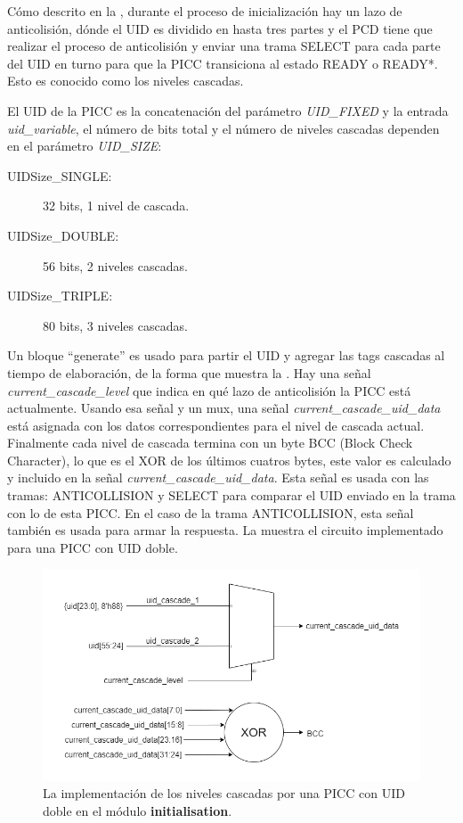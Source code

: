 \documentclass[a4paper, twoside, 11pt]{report}
\begin{document}
Cómo descrito en la , durante el proceso de inicialización hay un lazo de anticolisión, dónde el UID es dividido en hasta tres partes y el PCD tiene que realizar el proceso de anticolisión y enviar una trama SELECT para cada parte del UID en turno para que la PICC transiciona al estado READY o READY*. Esto es conocido como los niveles cascadas.

El UID de la PICC es la concatenación del parámetro \textit{UID\_FIXED} y la entrada \textit{uid\_variable}, el número de bits total y el número de niveles cascadas dependen en el parámetro \textit{UID\_SIZE}:

\begin{description}
    \item [UIDSize\_SINGLE:] 32 bits, 1 nivel de cascada.
    \item [UIDSize\_DOUBLE:] 56 bits, 2 niveles cascadas.
    \item [UIDSize\_TRIPLE:] 80 bits, 3 niveles cascadas.
\end{description}

Un bloque “generate” es usado para partir el UID y agregar las tags cascadas al tiempo de elaboración, de la forma que muestra la . Hay una señal \textit{current\_cascade\_level} que indica en qué lazo de anticolisión la PICC está actualmente. Usando esa señal y un mux, una señal \textit{current\_cascade\_uid\_data} está asignada con los datos correspondientes para el nivel de cascada actual. Finalmente cada nivel de cascada termina con un byte BCC (Block Check Character), lo que es el XOR de los últimos cuatros bytes, este valor es calculado y incluido en la señal \textit{current\_cascade\_uid\_data}. Esta señal es usada con las tramas: ANTICOLLISION y SELECT para comparar el UID enviado en la trama con lo de esta PICC. En el caso de la trama ANTICOLLISION, esta señal también es usada para armar la respuesta. La  muestra el circuito implementado para una PICC con UID doble.

\begin{figure}[htb]
  \centering
  \includegraphics[width=1.0\textwidth]{./img/initialisation_uid.drawio}
  \caption{La implementación de los niveles cascadas por una PICC con UID doble en el módulo \textbf{initialisation}.}
  \label{fig:init_cascade_levels}
\end{figure}
\end{document}
